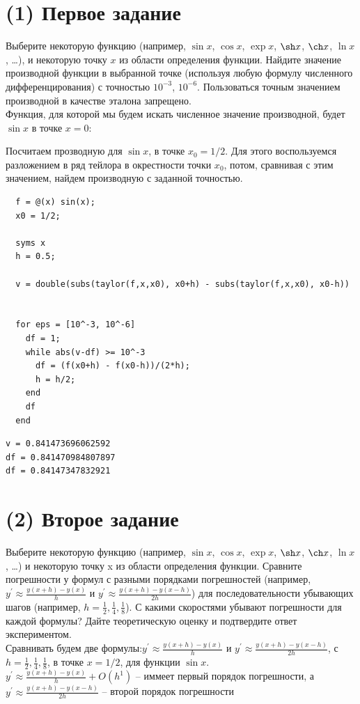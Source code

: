 \maketitle
\tableofcontents
\newpage
\section{(1) Первое задание}
Выберите некоторую функцию (например, $\sin x$, $\cos x$, $\exp x$, $\sh x$, $\ch x$, $\ln x$, \ldots), и некоторую точку $x$ из области определения функции. Найдите значение производной функции в выбранной точке (используя любую формулу численного дифференцирования) с точностью $10^{-3}$, $10^{-6}$. Пользоваться точным значением производной в качестве эталона запрещено.\\[2mm]

Функция, для которой мы будем искать численное значение производной, будет $\sin x$ в точке $x = 0$:


Посчитаем прозводную для $\sin x$, в точке $x_{0} = 1/2$. Для этого воспользуемся разложением в ряд тейлора в окрестности точки $x_{0}$, потом, сравнивая с этим значением, найдем производную с заданной точностью.

\begin{lstlisting}
  f = @(x) sin(x);
  x0 = 1/2;

  syms x
  h = 0.5;

  v = double(subs(taylor(f,x,x0), x0+h) - subs(taylor(f,x,x0), x0-h))


  for eps = [10^-3, 10^-6]
    df = 1;
    while abs(v-df) >= 10^-3
      df = (f(x0+h) - f(x0-h))/(2*h);
      h = h/2;
    end
    df
  end
\end{lstlisting}

\begin{lstlisting}[backgroundcolor=\color{cyan}]
v = 0.841473696062592
df = 0.841470984807897
df = 0.84147347832921
\end{lstlisting}

\section{(2) Второе задание}
Выберите некоторую функцию (например, $\sin x$, $\cos x$, $\exp x$, $\sh x$, $\ch x$, $\ln x$, \ldots) и некоторую точку x из области определения функции. Сравните погрешности у формул с разными порядками погрешностей (например, $y^{'} \approx \frac{y(x+h) - y(x)}{h}$ и $y^{'} \approx \frac{y(x+h) - y(x-h)}{2h}$) для последовательности убывающих шагов (например, $h = \frac{1}{2}, \frac{1}{4}, \frac{1}{8}$). С какими скоростями убывают погрешности для каждой формулы? Дайте теоретическую оценку и подтвердите ответ экспериментом.\\[5mm]
Сравнивать будем две формулы:$y^{'} \approx \frac{y(x+h) - y(x)}{h}$ и $y^{'} \approx \frac{y(x+h) - y(x-h)}{2h}$, с $h = \frac{1}{2}, \frac{1}{4}, \frac{1}{8}$, в точке $x = 1/2$, для функции $\sin x$.\\
$y^{'} \approx \frac{y(x+h) - y(x)}{h} +O(h^{1})$ -- иммеет первый порядок погрешности, а $y^{'} \approx \frac{y(x+h) - y(x-h)}{2h}$ -- второй порядок погрешности

